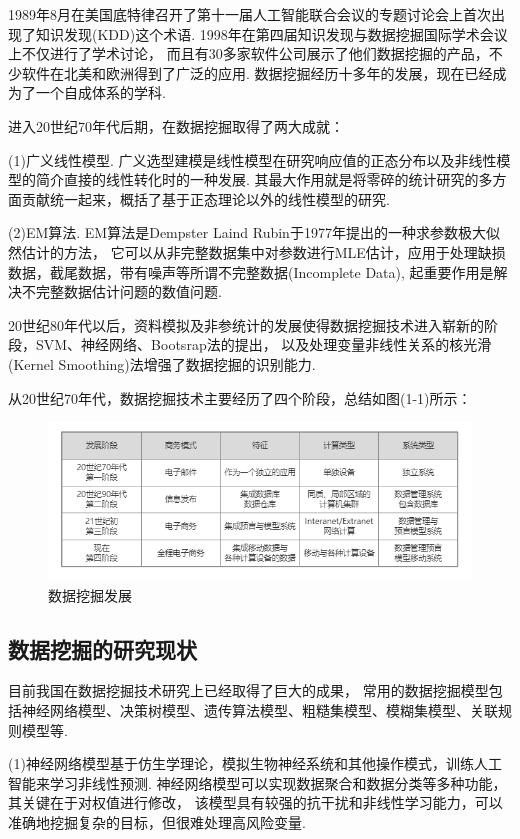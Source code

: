 \documentclass[bachelor,adobefonts]{jnuthesis}
\begin{document}
1989年8月在美国底特律召开了第十一届人工智能联合会议的专题讨论会上首次出现了知识发现(KDD)这个术语.
1998年在第四届知识发现与数据挖掘国际学术会议上不仅进行了学术讨论，
而且有30多家软件公司展示了他们数据挖掘的产品，不少软件在北美和欧洲得到了广泛的应用.
数据挖掘经历十多年的发展，现在已经成为了一个自成体系的学科.

进入20世纪70年代后期，在数据挖掘取得了两大成就：

(1)广义线性模型.
广义选型建模是线性模型在研究响应值的正态分布以及非线性模型的简介直接的线性转化时的一种发展.
其最大作用就是将零碎的统计研究的多方面贡献统一起来，概括了基于正态理论以外的线性模型的研究.

(2)EM算法.
EM算法是Dempster Laind Rubin于1977年提出的一种求参数极大似然估计的方法，
它可以从非完整数据集中对参数进行MLE估计，应用于处理缺损数据，截尾数据，带有噪声等所谓不完整数据(Incomplete Data),
起重要作用是解决不完整数据估计问题的数值问题.

20世纪80年代以后，资料模拟及非参统计的发展使得数据挖掘技术进入崭新的阶段，SVM、神经网络、Bootsrap法的提出，
以及处理变量非线性关系的核光滑(Kernel Smoothing)法增强了数据挖掘的识别能力.

从20世纪70年代，数据挖掘技术主要经历了四个阶段，总结如图(1-1)所示：

\begin{figure}[htp]
  \centering
  \includegraphics[width=1.0\linewidth]{Wsjwj.png}
  \caption{数据挖掘发展}
\end{figure}


\subsection{数据挖掘的研究现状}
目前我国在数据挖掘技术研究上已经取得了巨大的成果，
常用的数据挖掘模型包括神经网络模型、决策树模型、遗传算法模型、粗糙集模型、模糊集模型、关联规则模型等.

(1)神经网络模型基于仿生学理论，模拟生物神经系统和其他操作模式，训练人工智能来学习非线性预测. 
神经网络模型可以实现数据聚合和数据分类等多种功能，其关键在于对权值进行修改，
该模型具有较强的抗干扰和非线性学习能力，可以准确地挖掘复杂的目标，但很难处理高风险变量.
\end{document}
